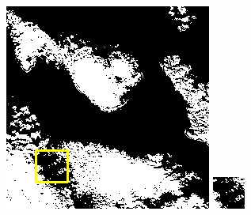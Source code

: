 \documentclass[10pt,UTF8,fntef]{ctexart}
\begin{document}
\begin{figure}[H]
{{\begin{minipage}[b]{0.15\linewidth}
            \includegraphics[width=1\linewidth]{../log/spoon3/cut/LC80290372013257LGN00_17086_qa.jpg}\vspace{4pt}
            \includegraphics[width=1\linewidth]{../log/spoon3/cut/tmp_cut_LC80290372013257LGN00_17086_qa.jpg}\vspace{4pt}

\end{minipage}}}
\end{figure}
\end{document}
